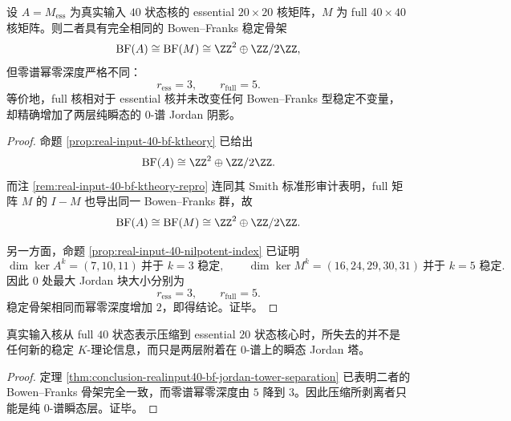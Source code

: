 \begin{theorem}\label{thm:conclusion-realinput40-bf-jordan-tower-separation}
设 \(A=M_{\mathrm{ess}}\) 为真实输入 \(40\) 状态核的 essential \(20\times 20\) 核矩阵，\(M\) 为 full \(40\times 40\) 核矩阵。则二者具有完全相同的 Bowen--Franks 稳定骨架
\[
\mathrm{BF}(A)\cong \mathrm{BF}(M)\cong \ZZ^2\oplus \ZZ/2\ZZ,
\]
但零谱幂零深度严格不同：
\[
r_{\mathrm{ess}}=3,\qquad r_{\mathrm{full}}=5.
\]
等价地，full 核相对于 essential 核并未改变任何 Bowen--Franks 型稳定不变量，却精确增加了两层纯瞬态的 \(0\)-谱 Jordan 阴影。
\end{theorem}
\begin{proof}
命题 \ref{prop:real-input-40-bf-ktheory} 已给出
\[
\mathrm{BF}(A)\cong \ZZ^2\oplus \ZZ/2\ZZ.
\]
而注 \ref{rem:real-input-40-bf-ktheory-repro} 连同其 Smith 标准形审计表明，full 矩阵 \(M\) 的 \(I-M\) 也导出同一 Bowen--Franks 群，故
\[
\mathrm{BF}(A)\cong \mathrm{BF}(M)\cong \ZZ^2\oplus \ZZ/2\ZZ.
\]

另一方面，命题 \ref{prop:real-input-40-nilpotent-index} 已证明
\[
\dim\ker A^k=(7,10,11)\ \text{并于 }k=3\text{ 稳定},
\qquad
\dim\ker M^k=(16,24,29,30,31)\ \text{并于 }k=5\text{ 稳定}.
\]
因此 \(0\) 处最大 Jordan 块大小分别为
\[
r_{\mathrm{ess}}=3,\qquad r_{\mathrm{full}}=5.
\]
稳定骨架相同而幂零深度增加 \(2\)，即得结论。证毕。
\end{proof}

\begin{corollary}\label{cor:conclusion-realinput40-full-essential-pure-zero-spectrum-stripping}
真实输入核从 full \(40\) 状态表示压缩到 essential \(20\) 状态核心时，所失去的并不是任何新的稳定 \(K\)-理论信息，而只是两层附着在 \(0\)-谱上的瞬态 Jordan 塔。
\end{corollary}
\begin{proof}
定理 \ref{thm:conclusion-realinput40-bf-jordan-tower-separation} 已表明二者的 Bowen--Franks 骨架完全一致，而零谱幂零深度由 \(5\) 降到 \(3\)。因此压缩所剥离者只能是纯 \(0\)-谱瞬态层。证毕。
\end{proof}

